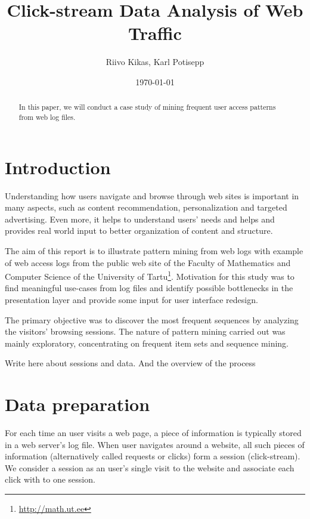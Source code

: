 \documentclass[english,a4paper]{article}
\begin{document}
\title{Click-stream Data Analysis of Web Traffic}
\author{Riivo Kikas, Karl Potisepp}
\date{\today}
\maketitle

\begin{abstract}
In  this paper, we will conduct a case study of mining frequent user access patterns from web log files.
\end{abstract}





\section{Introduction} 
Understanding how users navigate and browse through web sites is important in many aspects, such as content recommendation,
personalization and targeted advertising. Even more, it helps to understand users' needs and helps and provides real world input to better organization of content and structure.

The aim of this report is to illustrate pattern mining from web logs with example of web access logs from the public web site of the Faculty of Mathematics and Computer Science of the University of Tartu\footnote{\url{http://math.ut.ee}}. Motivation for this study was to find meaningful use-cases from log files and identify possible bottlenecks in the presentation layer and provide some input for user interface redesign. 


The primary objective was to discover the most frequent sequences by analyzing the visitors' browsing sessions. The nature of pattern mining carried out was mainly exploratory, concentrating on frequent item sets and sequence mining.

Write here about sessions and data. And the overview of the process








\section{Data preparation} 
For each time an user visits a web page, a piece of information is typically stored in a web server's log file. When user navigates around a website, all such pieces of information (alternatively called requests or clicks) form a session (click-stream). We consider a session as an user's single visit to the website and associate each click with to one session.
\end{document}
